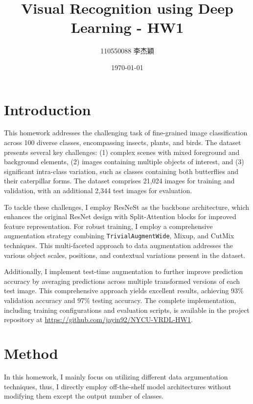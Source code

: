 \documentclass[twocolumn,a4paper]{article}
\title{Visual Recognition using Deep Learning - HW1}
\author{110550088 李杰穎}
\date{\today}
\begin{document}
\maketitle
\section{Introduction}

This homework addresses the challenging task of fine-grained image classification across 100 diverse classes, encompassing insects, plants, and birds. The dataset presents several key challenges: (1) complex scenes with mixed foreground and background elements, (2) images containing multiple objects of interest, and (3) significant intra-class variation, such as classes containing both butterflies and their caterpillar forms. The dataset comprises 21,024 images for training and validation, with an additional 2,344 test images for evaluation.

To tackle these challenges, I employ ResNeSt\cite{zhang2022resnest} as the backbone architecture, which enhances the original ResNet\cite{he2016deep} design with Split-Attention blocks for improved feature representation. For robust training, I employ a comprehensive augmentation strategy combining \texttt{TrivialAugmentWide}\cite{muller2021trivialaugment}, Mixup\cite{zhang2018mixup}, and CutMix\cite{yun2019cutmix} techniques. This multi-faceted approach to data augmentation addresses the various object scales, positions, and contextual variations present in the dataset.

Additionally, I implement test-time augmentation to further improve prediction accuracy by averaging predictions across multiple transformed versions of each test image. This comprehensive approach yields excellent results, achieving 93\% validation accuracy and 97\% testing accuracy. The complete implementation, including training configurations and evaluation scripts, is available in the project repository at \url{https://github.com/jayin92/NYCU-VRDL-HW1}.

\section{Method}

In this homework, I mainly focus on utilizing different data argumentation techniques, thus, I directly employ off-the-shelf model architectures without modifying them except the output number of classes.
\end{document}
